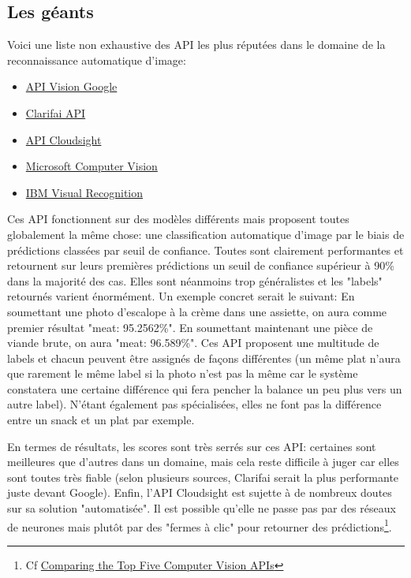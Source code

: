 \documentclass[a4paper,12pt]{report}
\begin{document}
      \subsection{Les géants}
      Voici une liste non exhaustive des API les plus réputées dans le domaine de la reconnaissance automatique d'image:
      \bigbreak
      \begin{itemize}
        \item \href{<https://cloud.google.com/vision/>}{API Vision Google}
        \item \href{<http://blog.clarifai.com/what-food-is-this-clarifais-food-recognition-technology-can-tell-you/#.WIS1NGqmmUk>}{Clarifai API}
        \item \href{<http://cloudsight.ai/api>}{API Cloudsight}
        \item \href{<https://www.microsoft.com/cognitive-services/en-us/computer-vision-api>}{Microsoft Computer Vision}
        \item \href{<https://www.ibm.com/watson/developercloud/visual-recognition.html#how-it-works-block>}{IBM Visual Recognition}
      \end{itemize}
      \bigbreak

      Ces API fonctionnent sur des modèles différents mais proposent toutes globalement la même chose: une classification automatique d'image par le biais de prédictions classées par seuil de confiance.
      \medbreak
      Toutes sont clairement performantes et retournent sur leurs premières prédictions un seuil de confiance supérieur à 90\% dans la majorité des cas. Elles sont néanmoins trop généralistes et les "labels" retournés varient énormément. Un exemple concret serait le suivant:
      \medbreak
      En soumettant une photo d'escalope à la crème dans une assiette, on aura comme premier résultat "meat: 95.2562\%". En soumettant maintenant une pièce de viande brute, on aura "meat: 96.589\%".
      \medbreak
      Ces API proposent une multitude de labels et chacun peuvent être assignés de façons différentes (un même plat n'aura que rarement le même label si la photo n'est pas la même car le système constatera une certaine différence qui fera pencher la balance un peu plus vers un autre label). N'étant également pas spécialisées, elles ne font pas la différence entre un snack et un plat par exemple.
      \bigbreak

      En termes de résultats, les scores sont très serrés sur ces API: certaines sont meilleures que d'autres dans un domaine, mais cela reste difficile à juger car elles sont toutes très fiable (selon plusieurs sources, Clarifai serait la plus performante juste devant Google). Enfin, l'API Cloudsight est sujette à de nombreux doutes sur sa solution "automatisée". Il est possible qu'elle ne passe pas par des réseaux de neurones mais plutôt par des "fermes à clic" pour retourner des prédictions\footnote{Cf \href{<https://goberoi.com/comparing-the-top-five-computer-vision-apis-98e3e3d7c647\#.karm8bonu>}{Comparing the Top Five Computer Vision APIs}}.
\end{document}
